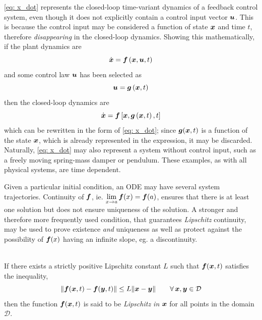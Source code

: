 \documentclass[12pt]{ucthesis}
\begin{document}
\autoref{eq: x_dot} represents the closed-loop time-variant dynamics of a feedback control system, even though it does not explicitly contain a control input vector $\boldsymbol{u}$. This is because the control input may be considered a function of state $\boldsymbol{x}$ and time $t$, therefore \textit{disappearing} in the closed-loop dynamics. Showing this mathematically, if the plant dynamics are
%
\begin{equation}
	\dot{\boldsymbol{x}} = \boldsymbol{f} \left( \boldsymbol{x},\boldsymbol{u},t \right)
	\label{eq: x_dot_g}
\end{equation}
%
and some control law $\boldsymbol{u}$ has been selected as
\begin{equation}
	\boldsymbol{u} = \boldsymbol{g} \left( \boldsymbol{x},t \right)
	\label{eq: x_dot_u}
\end{equation}
%
then the closed-loop dynamics are
\begin{equation}
	\dot{\boldsymbol{x}} = \boldsymbol{f} \left[ \boldsymbol{x},\boldsymbol{g} \left( \boldsymbol{x},t \right),t \right]
	\label{eq: x_dot_g_u}
\end{equation}
%
which can be rewritten in the form of \autoref{eq: x_dot}; since $\boldsymbol{g}(\boldsymbol{x},t)$ is a function of the state $\boldsymbol{x}$, which is already represented in the expression, it may be discarded. Naturally, \autoref{eq: x_dot} may also represent a system without control input, such as a freely moving spring-mass damper or pendulum. These examples, as with all physical systems, are time dependent.

Given a particular initial condition, an ODE may have several system trajectories. Continuity of $\boldsymbol{f}$, ie.
$\displaystyle \lim_{x \rightarrow a}\boldsymbol{f}(x)=\boldsymbol{f}(a)$, ensures that there is at least one solution but does not ensure uniqueness of the solution. A stronger and therefore more frequently used condition, that guarantees \textit{Lipschitz} continuity, may be used to prove existence \textit{and} uniqueness as well as protect against the possibility of $\boldsymbol{f}(x)$ having an infinite slope, eg. a discontinuity.

\begin{defn} \alignright \citet[\S 2.2]{Khalil1996}\\
	If there exists a strictly positive Lipschitz constant $L$ such that $\boldsymbol{f}(\boldsymbol{x},t)$ satisfies the inequality,
	$$ \lVert \boldsymbol{f}(\boldsymbol{x},t) - \boldsymbol{f}(\boldsymbol{y},t) \rVert \leq L \lVert \boldsymbol{x} - \boldsymbol{y} \rVert \qquad \forall \, \boldsymbol{x}, \boldsymbol{y} \in \mathcal{D}$$
	then the function $\boldsymbol{f}(\boldsymbol{x},t)$ is said to be \textit{Lipschitz in} $\boldsymbol{x}$ for all points in the domain $\mathcal{D}$. 
	\label{defn: lipschitz}
\end{defn}
\end{document}
